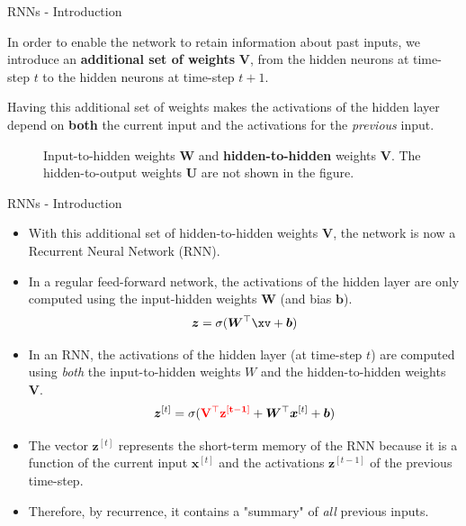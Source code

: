 \documentclass[11pt,compress,t,notes=noshow]{beamer}
\begin{document}
\begin{frame} {RNNs - Introduction}
  \begin{itemize}
    \item \small{In order to enable the network to retain information about past inputs, we introduce an \textbf{additional set of weights} $\bm{V}$, from the hidden neurons at time-step $t$ to the hidden neurons at time-step $t+1$.
    \item Having this additional set of weights makes the activations of the hidden layer depend on \textbf{both} the current input and the activations for the \textit{previous} input.}
  \end{itemize}
  \begin{figure}
      \centering
      \caption{\footnotesize Input-to-hidden weights $\bm{W}$ and \textbf{hidden-to-hidden} weights $\bm{V}$. The hidden-to-output weights $\bm{U}$ are not shown in the figure.}
  \end{figure}
\end{frame}

\begin{frame} {RNNs - Introduction}
  \begin{itemize}
    \item With this additional set of hidden-to-hidden weights $\bm{V}$, the network is now a Recurrent Neural Network (RNN).
    \item In a regular feed-forward network, the activations of the hidden layer are only computed using the input-hidden weights $\bm{W}$ (and bias $\bm{b}$).
    $$\bm{z}= \sigma(\bm{W}^\top \xv + \bm{b})$$
    \item In an RNN, the activations of the hidden layer (at time-step $t$) are computed using \textit{both} the input-to-hidden weights $W$ and the hidden-to-hidden weights $\bm{V}$.
    $$\bm{z}^{[t]} = \sigma(\mathbf{\textcolor{red}{\bm{V}^\top\bm{z}^{[t-1]}}} + \bm{W}^\top \bm{x}^{[t]} + \bm{b})$$
    \item The vector $\bm{z}^{[t]}$ represents the short-term memory of the RNN because it is a function of the current input $\bm{x}^{[t]}$ and the activations $\bm{z}^{[t-1]}$ of the previous time-step.
    \item Therefore, by recurrence, it contains a "summary" of \textit{all} previous inputs. 
  \end{itemize}
\end{frame}
\end{document}
